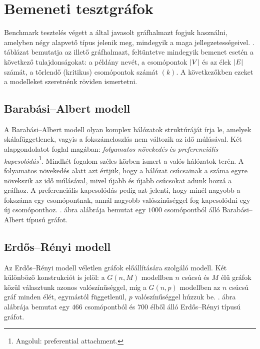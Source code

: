 \section{Bemeneti tesztgráfok}\label{sec:BENCHMARK-PROBLEM-INSTANCES}
Benchmark tesztelés végett a  által javasolt gráfhalmazt fogjuk használni, amelyben négy alapvető típus jelenik meg, mindegyik a maga jellegzetességeivel.
. táblázat bemutatja az illető gráfhalmazt, feltüntetve mindegyik bemenet esetén a következő tulajdonságokat:
a példány nevét, a csomópontok $\lvert V\rvert$ és az élek $\lvert E\rvert$ számát, a törlendő (kritikus) csomópontok számát $\left( k \right)$.
A következőkben ezeket a modelleket szeretnénk röviden ismertetni.


\subsection{Barabási–Albert modell}
A Barabási–Albert modell olyan komplex hálózatok struktúráját írja le, amelyek skálafüggetlenek, vagyis a fokszámeloszlás nem változik az idő múlásával.
Két alapgondolatot foglal magában: \textit{folyamatos növekedés} és \textit{preferenciális kapcsolódás}\footnote{ Angolul: preferential attachment. }. Mindkét fogalom széles körben ismert a valós hálózatok terén.
A folyamatos növekedés alatt azt értjük, hogy a hálózat csúcsainak a száma egyre növekszik az idő múlásával, mivel újabb és újabb csúcsokat adunk hozzá a gráfhoz.
A preferenciális kapcsolódás pedig azt jelenti, hogy minél nagyobb a fokszáma egy csomópontnak, annál nagyobb valószínűséggel fog kapcsolódni egy új csomóponthoz.
. ábra  alábrája bemutat egy $1000$ csomópontból álló Barabási–Albert típusú gráfot.


\subsection{Erdős–Rényi modell}
Az Erdős–Rényi modell véletlen gráfok előállítására szolgáló modell. Két különböző konstrukciót is jelöl:
a $G(n, M)$ modellben $n$ csúcsú és $M$ élű gráfok közül választunk azonos valószínűséggel,
míg a $G(n, p)$ modellben az $n$ csúcsú gráf minden élét, egymástól függetlenül, $p$ valószínűséggel húzzuk be.
. ábra  alábrája bemutat egy $466$ csomópontból és 700 élből álló Erdős–Rényi típusú gráfot.


